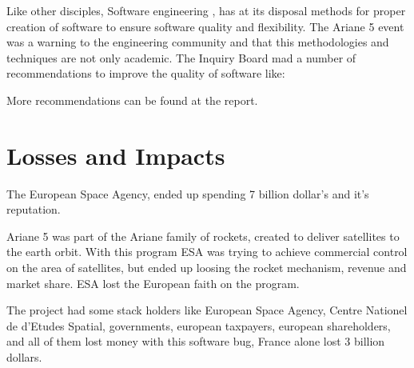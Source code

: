 \documentclass[
12pt, %
a4paper, %
oneside, %
headinclude,footinclude, %
BCOR5mm, %
]{scrartcl}
\begin{document}
Like other disciples, Software engineering \cite{softwaretechniques:1970}, has at its disposal methods for proper creation of software to ensure software quality and flexibility. The Ariane 5 event was a warning to the engineering community and that this methodologies and techniques are not only academic. The Inquiry Board \cite{Report:1996} mad a number of recommendations to improve the quality of software like:





More recommendations can be found at the report.

\let\thefootnote\relax{}


\section{Losses and Impacts}

The European Space Agency, ended up spending 7 billion dollar's and it's reputation.

Ariane 5 was part of the Ariane family of rockets, created to deliver satellites to the earth orbit. With this program ESA was trying to achieve commercial control on the area of satellites, but ended up loosing the rocket mechanism, revenue and market share. ESA lost the European faith on the program.

The project had some stack holders like European Space Agency, Centre Nationel de d'Etudes Spatial, governments, european taxpayers, european shareholders, and all of them lost money with this software bug, France alone lost 3 billion dollars.
\end{document}
